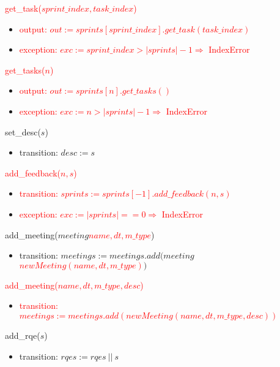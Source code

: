 \documentclass[12pt, titlepage]{article}
\begin{document}
\noindent \textcolor{red}{get\_task($sprint\_index, task\_index$)}
\begin{itemize}
    \item \textcolor{red}{output: $out := sprints[sprint\_index].get\_task(task\_index)$}
    \item \textcolor{red}{exception: $exc := sprint\_index > |sprints| - 1 \Rightarrow$ IndexError}
\end{itemize}

\noindent \textcolor{red}{get\_tasks($n$)}
\begin{itemize}
    \item \textcolor{red}{output: $out := sprints[n].get\_tasks()$}
    \item \textcolor{red}{exception: $exc := n > |sprints| - 1 \Rightarrow$ IndexError}
\end{itemize}

\noindent set\_desc($s$)
\begin{itemize}
    \item transition: $desc := s$
\end{itemize}

\noindent \textcolor{red}{add\_feedback($n,s$)}
\begin{itemize}
    \item \textcolor{red}{transition: $sprints := sprints[-1].add\_feedback(n,s)$}
    \item \textcolor{red}{exception: $exc := |sprints| == 0 \Rightarrow$ IndexError}
\end{itemize}

\noindent add\_meeting(\sout{$meeting$}\textcolor{red}{$name, dt, m\_type$})
\begin{itemize}
    \item transition: $meetings := meetings.add($\sout{$meeting$}\textcolor{red}{$new Meeting(name, dt, m\_type)$}$)$
\end{itemize}

\noindent \textcolor{red}{add\_meeting($name, dt, m\_type, desc$)}
\begin{itemize}
    \item \textcolor{red}{transition: $meetings := meetings.add(new Meeting(name, dt, m\_type, desc))$}
\end{itemize}

\noindent add\_rqe($s$)
\begin{itemize}
    \item transition: $rqes := rqes\ ||\ s$
\end{itemize}
\end{document}
